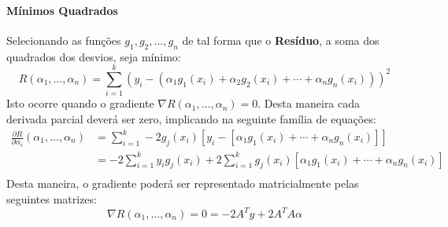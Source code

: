 \documentclass{article}
\begin{document}
            \paragraph{Mínimos Quadrados}Selecionando as funções $g_{1}, g_{2}, \dots, g_{n}$ de tal forma que o \textbf{Resíduo}, a soma dos quadrados dos desvios, seja mínimo:
                \[\boxed{R(\alpha_{1}, \dots, \alpha_{n}) = \sum_{i=1}^{k} (y_{i} - (\alpha_{1} g_{1}(x_{i}) + \alpha_{2} g_{2}(x_{i}) + \cdots + \alpha_{n} g_{n}(x_{i})))^{2}}\]
            Isto ocorre quando o gradiente $\nabla R (\alpha_{1}, \dots, \alpha_{n}) = 0$. Desta maneira cada derivada parcial deverá ser zero, implicando na seguinte família de equações:
                \[
                    \begin{split}\frac{\partial R}{\partial\alpha_{i}}(\alpha_{1}, \dots, \alpha_{n})
                        &= \sum_{i=1}^{k} -2g_{j}(x_{i})[y_{i} - [\alpha_{1} g_{1}(x_{i}) +
                                                                  \cdots +
                                                                  \alpha_{n} g_{n}(x_{i})]]\\
                        &= -2\sum_{i=1}^{k} y_{i}g_{j}(x_{i}) +
                            2\sum_{i=1}^{k} g_{j}(x_{i})[\alpha_{1} g_{1}(x_{i}) +
                                                         \cdots +
                                                         \alpha_{n} g_{n}(x_{i})]\\
                    \end{split}
                \]
            Desta maneira, o gradiente poderá ser representado matricialmente pelas seguintes matrizes:
                \[\boxed{\nabla R(\alpha_{1}, \dots, \alpha_{n}) = 0 = -2A^{T}y + 2A^{T}A\alpha}\]
\end{document}
